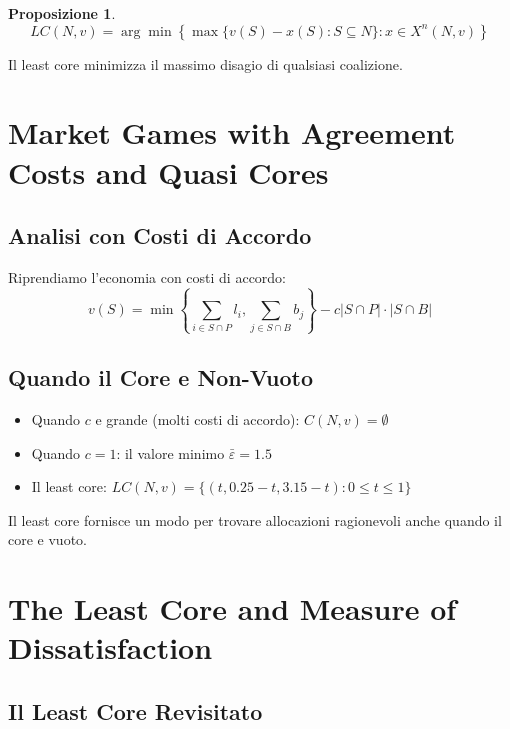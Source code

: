 \documentclass[12pt,a4paper]{article}
\theoremstyle{definition}
\newtheorem{proposition}[definition]{Proposizione}
\begin{document}
\begin{proposition}
\[
LC(N, v) = \arg \min \left\{ \max\{v(S) - x(S) : S \subseteq N\} : x \in X^n(N, v) \right\}
\]
\end{proposition}

Il least core minimizza il massimo disagio di qualsiasi coalizione.

\newpage

\section{Market Games with Agreement Costs and Quasi Cores}

\subsection*{Analisi con Costi di Accordo}

Riprendiamo l'economia con costi di accordo:
\[
v(S) = \min \left\{ \sum_{i \in S \cap P} l_i, \sum_{j \in S \cap B} b_j \right\} - c |S \cap P| \cdot |S \cap B|
\]

\subsection*{Quando il Core e Non-Vuoto}

\begin{itemize}
    \item Quando $c$ e grande (molti costi di accordo): $C(N, v) = \emptyset$

    \item Quando $c = 1$: il valore minimo $\bar{\varepsilon} = 1.5$

    \item Il least core: $LC(N, v) = \{(t, 0.25 - t, 3.15 - t) : 0 \leq t \leq 1\}$
\end{itemize}

Il least core fornisce un modo per trovare allocazioni ragionevoli anche quando il core e vuoto.

\newpage

\section{The Least Core and Measure of Dissatisfaction}

\subsection*{Il Least Core Revisitato}
\end{document}
